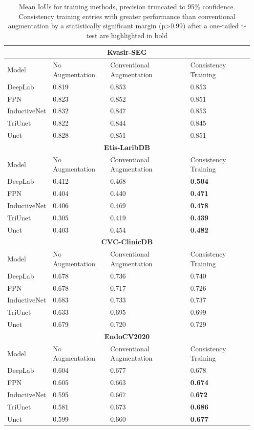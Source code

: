 \begin{table}[h!]
    \centering
    \begin{tabularx}{\linewidth}{llXX}
    \toprule
    \multicolumn{4}{c}{\textbf{Kvasir-SEG}}\\
    \toprule
    Model & No Augmentation & Conventional Augmentation & Consistency Training\\
    \midrule
        DeepLab & 0.819& 0.853& 0.853 \\
        FPN & 0.823& 0.852& 0.851 \\
        InductiveNet & 0.832& 0.847& 0.853 \\
        TriUnet & 0.822& 0.844& 0.845 \\
        Unet & 0.828& 0.851& 0.851 \\
    \toprule
    \multicolumn{4}{c}{\textbf{Etis-LaribDB}}\\
    \toprule
    Model & No Augmentation & Conventional Augmentation & Consistency Training\\
    \midrule
        DeepLab & 0.412& 0.468& \textbf{0.504} \\
        FPN & 0.404& 0.440& \textbf{0.471} \\
        InductiveNet & 0.406& 0.469& \textbf{0.478} \\
        TriUnet & 0.305& 0.419& \textbf{0.439} \\
        Unet & 0.403& 0.454& \textbf{0.482} \\
    \toprule
    \multicolumn{4}{c}{\textbf{CVC-ClinicDB}}\\
    \toprule
    Model & No Augmentation & Conventional Augmentation & Consistency Training\\
    \midrule
        DeepLab & 0.678& 0.736& 0.740 \\
        FPN & 0.678& 0.717& 0.726 \\
        InductiveNet & 0.683& 0.733& 0.737 \\
        TriUnet & 0.633& 0.695& 0.699 \\
        Unet & 0.679& 0.720& 0.729 \\
    \toprule
    \multicolumn{4}{c}{\textbf{EndoCV2020}}\\
    \toprule
    Model & No Augmentation & Conventional Augmentation & Consistency Training\\
    \midrule
                DeepLab & 0.604& 0.677& 0.678 \\
                FPN & 0.605& 0.663& \textbf{0.674} \\
                InductiveNet & 0.595& 0.667& 0.\textbf{672 }\\
                TriUnet & 0.581& 0.673& \textbf{0.686} \\
                Unet & 0.599& 0.660& \textbf{0.677} \\
    \bottomrule
    \end{tabularx}
    \caption{Mean IoUs for training methods, precision truncated to 95\% confidence. Consistency training entries with greater performance than conventional augmentation by a statistically significant margin (p>0.99) after a one-tailed t-test are highlighted in bold}
    \label{tab:aug_ious}
\end{table}
